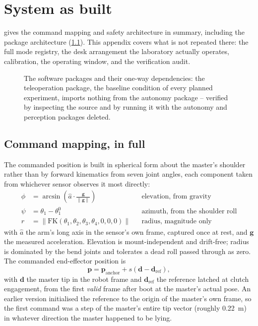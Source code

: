 \chapter{System as built}
\label{ch:method}

 gives the command mapping and safety architecture in
summary, including the package architecture (\cref{fig:arch}). This
appendix covers what is not repeated there: the full mode registry, the
desk arrangement the laboratory actually operates, calibration, the
operating window, and the verification audit.

\begin{figure}[htbp]
  \centering
  
  \caption[Package architecture]{The software packages and their one-way
  dependencies: the teleoperation package, the baseline condition of every
  planned experiment, imports nothing from the autonomy package -- verified
  by inspecting the source and by running it with the autonomy and
  perception packages deleted.}
  \label{fig:arch}
\end{figure}

\section{Command mapping, in full}

The commanded position is built in spherical form about the master's
shoulder rather than by forward kinematics from seven joint angles, each
component taken from whichever sensor observes it most directly:
\begin{align}
  \phi &= \arcsin\!\left(\hat{a}\cdot\frac{\mathbf{g}}{\lVert\mathbf{g}\rVert}\right)
    &&\text{elevation, from gravity} \label{eq:elev}\\
  \psi &= \theta_1-\theta_1^0 &&\text{azimuth, from the shoulder roll} \label{eq:azim}\\
  r &= \lVert\mathrm{FK}(\theta_1,\theta_2,\theta_3,\theta_4,0,0,0)\rVert &&\text{radius, magnitude only} \label{eq:reach}
\end{align}
with $\hat{a}$ the arm's long axis in the sensor's own frame, captured once
at rest, and $\mathbf{g}$ the measured acceleration. Elevation is
mount-independent and drift-free; radius is dominated by the bend joints and
tolerates a dead roll passed through as zero. The commanded end-effector
position is
\begin{equation}
  \mathbf{p} = \mathbf{p}_{\text{anchor}} + s(\mathbf{d}-\mathbf{d}_{\text{ref}}),
  \label{eq:anchor}
\end{equation}
with $\mathbf{d}$ the master tip in the robot frame and
$\mathbf{d}_{\text{ref}}$ the reference latched at clutch engagement, from
the first \emph{valid} frame after boot at the master's actual pose. An
earlier version initialised the reference to the origin of the master's own
frame, so the first command was a step of the master's entire tip vector
(roughly \SI{0.22}{\metre}) in whatever direction the master happened to be
lying.

